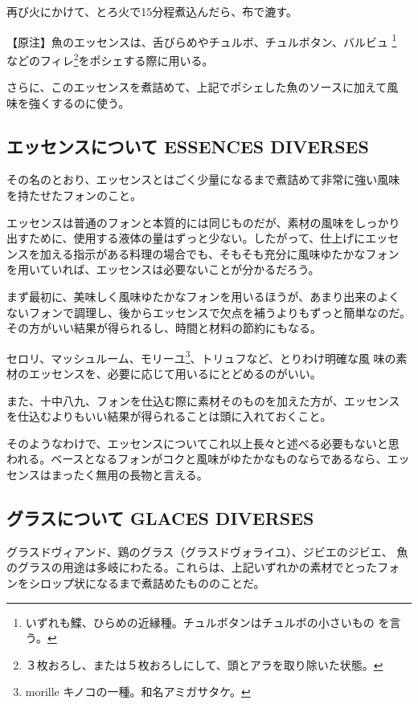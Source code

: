 \documentclass[twoside,12Q,b5paper]{escoffierltjsbook}
\newenvironment{recette}{\begin{multicols}{2}}{\end{multicols}}
\begin{document}
\begin{recette}
再び火にかけて、とろ火で15分程煮込んだら、布で漉す。

【原注】魚のエッセンスは、舌びらめやチュルボ、チュルボタン、バルビュ
\footnote{いずれも鰈、ひらめの近縁種。チュルボタンはチュルボの小さいもの
  を言う。} などのフィレ\footnote{３枚おろし、または５枚おろしにして、頭とアラを取り除いた状態。}をポシェする際に用いる。

さらに、このエッセンスを煮詰めて、上記でポシェした魚のソースに加えて風
味を強くするのに使う。

\subsection{エッセンスについて ESSENCES
DIVERSES}\label{ux30a8ux30c3ux30bbux30f3ux30b9ux306bux3064ux3044ux3066-essences-diverses}

その名のとおり、エッセンスとはごく少量になるまで煮詰めて非常に強い風味
を持たせたフォンのこと。

エッセンスは普通のフォンと本質的には同じものだが、素材の風味をしっかり
出すために、使用する液体の量はずっと少ない。したがって、仕上げにエッセ
ンスを加える指示がある料理の場合でも、そもそも充分に風味ゆたかなフォン
を用いていれば、エッセンスは必要ないことが分かるだろう。

まず最初に、美味しく風味ゆたかなフォンを用いるほうが、あまり出来のよく
ないフォンで調理し、後からエッセンスで欠点を補うよりもずっと簡単なのだ。
その方がいい結果が得られるし、時間と材料の節約にもなる。

セロリ、マッシュルーム、モリーユ\footnote{morille
  キノコの一種。和名アミガサタケ。}、トリュフなど、とりわけ明確な風
味の素材のエッセンスを、必要に応じて用いるにとどめるのがいい。

また、十中八九、フォンを仕込む際に素材そのものを加えた方が、エッセンス
を仕込むよりもいい結果が得られることは頭に入れておくこと。

そのようなわけで、エッセンスについてこれ以上長々と述べる必要もないと思
われる。ベースとなるフォンがコクと風味がゆたかなものならであるなら、エッ
センスはまったく無用の長物と言える。

\subsection{グラスについて GLACES
DIVERSES}\label{ux30b0ux30e9ux30b9ux306bux3064ux3044ux3066-glaces-diverses}

グラスドヴィアンド、鶏のグラス（グラスドヴォライユ）、ジビエのジビエ、
魚のグラスの用途は多岐にわたる。これらは、上記いずれかの素材でとったフォ
ンをシロップ状になるまで煮詰めたもののことだ。


\end{recette}
\end{document}
